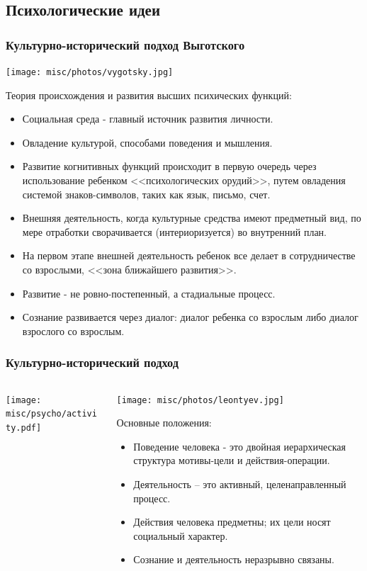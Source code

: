 \documentclass[default]{beamer}
\begin{document}
	\subsection{Психологические идеи}
	\begin{frame}
		\frametitle{Культурно-исторический подход Выготского}
		\begin{center}
			\texttt{[image: misc/photos/vygotsky.jpg]}
		\end{center}
		\scriptsize
		Теория происхождения и развития высших психических функций:
		\begin{itemize}
			\item Социальная среда - главный источник развития личности.
			\item Овладение культурой, способами поведения и мышления.
			\item Развитие когнитивных функций происходит в первую очередь через использование ребенком <<психологических орудий>>, путем овладения системой знаков-символов, таких как язык, письмо, счет.
			\item Внешняя деятельность, когда культурные средства имеют предметный вид, по мере отработки сворачивается (интериоризуется) во внутренний план.
			\item На первом этапе внешней деятельность ребенок все делает в сотрудничестве со взрослыми, <<зона ближайшего развития>>.
			\item Развитие - не ровно-постепенный, а стадиальные процесс.
			\item Сознание развивается через диалог: диалог ребенка со взрослым либо диалог взрослого со взрослым.
		\end{itemize}
		\end{frame}
	
	\begin{frame}
		\frametitle{Культурно-исторический подход}
		\begin{columns}
			\begin{column}{0.4\textwidth}
				\texttt{[image: misc/psycho/activity.pdf]}			
			\end{column}
			\begin{column}{0.6\textwidth}
				\begin{center}
					\texttt{[image: misc/photos/leontyev.jpg]}
				\end{center}
				Основные положения:
				\begin{itemize}
					\item Поведение человека - это двойная иерархическая структура мотивы-цели и действия-операции.
					\item Деятельность – это активный, целенаправленный процесс.
					\item Действия человека предметны; их цели носят социальный характер.
					\item Сознание и деятельность неразрывно связаны.
				\end{itemize}
			\end{column}
		\end{columns}
	\end{frame}
\end{document}
